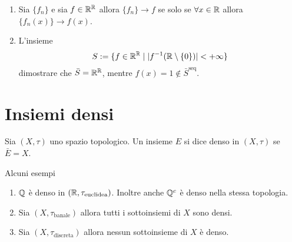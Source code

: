 \begin{remark}
\begin{enumerate}
		\begin{proof}
			Fisso un punto $x_0 = 0$ e considero $\{V(f, \{x_0\}, 1/N)\}_{N \in \N}$ questa è la prima famiglia numerabile del sistema di intorni di $f$, la seconda è $\{V(f, \{x_0\}, \sum_{i=1}^{N} 1/i) \}_{N \in \N}$, assieme fanno un sistema fondamentale di intorni di $f$. Pertanto soddisfa il primo assioma di numerabilità\footnote{Non completamente convinto e non so come dimostrarlo}.
		\end{proof}
		\item Sia $\{f_n\}$ e sia $f \in \mathbb{R}^{\mathbb{R}}$ allora $\{f_n\} \rightarrow f$ se solo se $\forall x \in \mathbb{R}$ allora $\{f_n(x)\} \rightarrow f(x)$.
		\item L'insieme 
		\begin{equation}
		\begin{aligned}	
			S := \{ f \in \mathbb{R}^{\mathbb{R}} \; | \; |f^{-1}(\mathbb{R} \setminus \{0\})| < +\infty \}
		\end{aligned}
		\end{equation}
		dimostrare che $\bar{S} = \mathbb{R}^{\mathbb{R}}$, mentre $f(x)= 1 \notin \bar{S}^\text{seq}$.
	\end{enumerate}
	\end{remark}

\section{Insiemi densi}
\begin{definition}
	Sia $(X,\tau)$ uno spazio topologico. Un insieme $E$ si dice denso in $(X, \tau)$ se $\bar{E} = X$. 
\end{definition}

Alcuni esempi
\begin{enumerate}
	\item $\mathbb{Q}$ è denso in $(\mathbb{R}, \tau_{\text{euclidea}})$. Inoltre anche $\mathbb{Q}^c$ è denso nella stessa topologia.
	\item Sia $(X,\tau_{\text{banale}})$ allora tutti i sottoinsiemi di $X$ sono densi.
	\item Sia $(X,\tau_{\text{discreta}})$ allora nessun sottoinsieme di $X$ è denso.
\end{enumerate}

